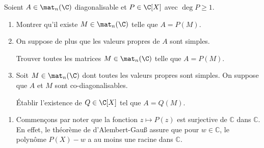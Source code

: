 \begin{enonce}
\begin{exercise}[ID={RMS 113/4 E172},subtitle={Mines-Ponts},tags={},difficulty={}]
Soient $A\in\mat_n(\C)$ diagonalisable et $P\in\C[X]$ avec $\deg P\geq 1$.
\begin{enumerate}
\item Montrer qu'il existe $M\in\mat_n(\C)$ telle que $A=P(M)$.
\item On suppose de plus que les valeurs propres de $A$ sont simples.
    
    Trouver toutes les matrices $M\in\mat_n(\C)$ telle que $A=P(M)$.
\item Soit $M\in\mat_n(\C)$ dont toutes les valeurs propres sont simples. On suppose que $A$ et $M$ sont co-diagonalisables. 
    
    Établir l'existence de $Q\in\C[X]$ tel que $A=Q(M)$.
\end{enumerate}
\end{exercise}
\begin{solution}
\begin{enumerate}
\item Commençons par noter que la fonction $z\mapsto P(z)$ est surjective de $\mathbb{C}$ dans $\mathbb{C}$.
  En effet, le théorème de d'Alembert-Gauß assure que pour $w\in\mathbb{C}$, le polynôme $P(X)-w$ a au moins une racine dans $\mathbb{C}$.


\end{enumerate}
\end{solution}
\end{enonce}
